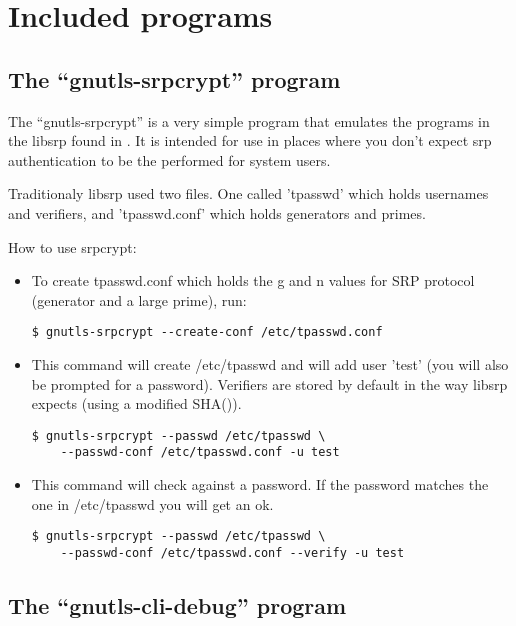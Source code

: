 \chapter{Included programs}

\section{The ``gnutls-srpcrypt'' program}
\label{srpcrypt}

The ``gnutls-srpcrypt'' is a very simple program that emulates the programs in the libsrp 
found in .
It is intended for use in places where you don't expect srp
authentication to be the performed for system users.

Traditionaly libsrp used two files. One called 'tpasswd' which holds usernames 
and verifiers, and 'tpasswd.conf' which holds generators and primes.
\par
How to use srpcrypt:

\begin{itemize}


\item To create tpasswd.conf which holds the g and n values for
SRP protocol (generator and a large prime), run:
\begin{verbatim}
$ gnutls-srpcrypt --create-conf /etc/tpasswd.conf
\end{verbatim}


\item This command will create /etc/tpasswd and will add user 'test' (you will also
be prompted for a password). Verifiers are stored by default in the
way libsrp expects (using a modified SHA()). 
\begin{verbatim}
$ gnutls-srpcrypt --passwd /etc/tpasswd \ 
    --passwd-conf /etc/tpasswd.conf -u test
\end{verbatim}

\item This command will check against a password. If the password matches 
the one in /etc/tpasswd you will get an ok.
\begin{verbatim}
$ gnutls-srpcrypt --passwd /etc/tpasswd \ 
    --passwd-conf /etc/tpasswd.conf --verify -u test
\end{verbatim}

\end{itemize}



\section{The ``gnutls-cli-debug'' program}

